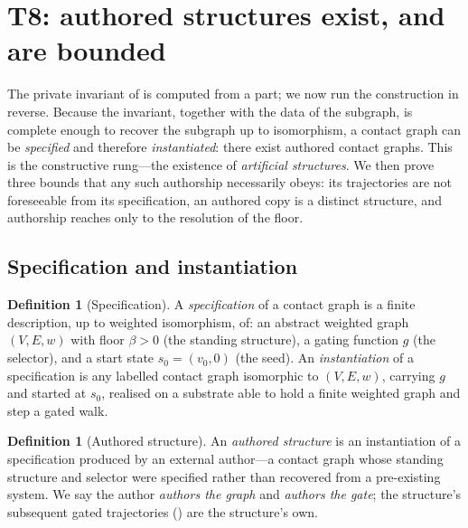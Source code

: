 \documentclass[11pt,a4paper]{article}
\theoremstyle{thmstyle}
\theoremstyle{definition}
\newtheorem{definition}[theorem]{Definition}
\theoremstyle{remark}
\newcommand{\V}{V}                        %
\newcommand{\E}{E}                        %
\newcommand{\wt}{w}                       %
\newcommand{\floorc}{\beta}               %
\newcommand{\gate}{g}                     %
\begin{document}
\section{T8: authored structures exist, and are bounded}
\label{sec:construct}

The private invariant of  is computed from a part; we now
run the construction in reverse. Because the invariant, together with the data of
the subgraph, is complete enough to recover the subgraph up to isomorphism, a
contact graph can be \emph{specified} and therefore \emph{instantiated}: there
exist authored contact graphs. This is the constructive rung---the existence of
\emph{artificial structures}. We then prove three bounds that any such authorship
necessarily obeys: its trajectories are not foreseeable from its specification,
an authored copy is a distinct structure, and authorship reaches only to the
resolution of the floor.

\subsection{Specification and instantiation}

\begin{definition}[Specification]
\label{def:spec}
A \emph{specification} of a contact graph is a finite description, up to weighted
isomorphism, of: an abstract weighted graph $(\V,\E,\wt)$ with floor $\floorc>0$
(the standing structure), a gating function $\gate$ (the selector), and a start
state $s_0=(v_0,0)$ (the seed). An \emph{instantiation} of a specification is any
labelled contact graph isomorphic to $(\V,\E,\wt)$, carrying $\gate$ and started
at $s_0$, realised on a substrate able to hold a finite weighted graph and step a
gated walk.
\end{definition}

\begin{definition}[Authored structure]
\label{def:authored}
An \emph{authored structure} is an instantiation of a specification produced by
an external author---a contact graph whose standing structure and selector were
specified rather than recovered from a pre-existing system. We say the author
\emph{authors the graph} and \emph{authors the gate}; the structure's subsequent
gated trajectories \textup{(}\textup{)} are the structure's
own.
\end{definition}
\end{document}
